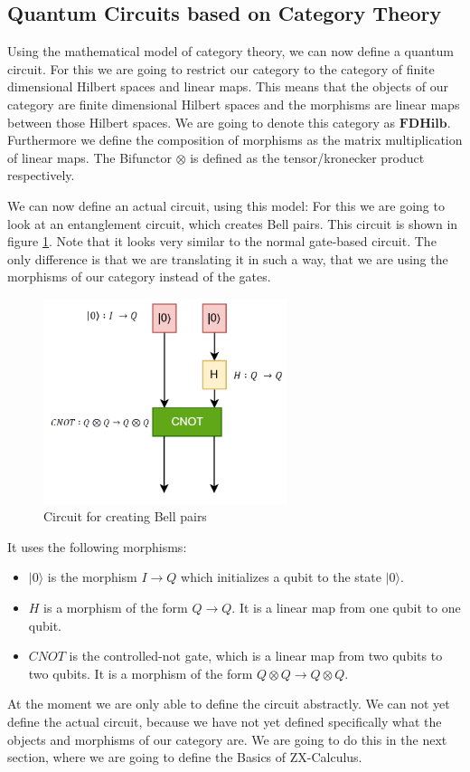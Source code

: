 \subsection{Quantum Circuits based on Category Theory}

Using the mathematical model of category theory, we can now define a quantum circuit. For this we are going to restrict our category to the category of finite dimensional Hilbert spaces and linear maps. This means that the objects of our category are finite dimensional Hilbert spaces and the morphisms are linear maps between those Hilbert spaces. We are going to denote this category as $\mathbf{FDHilb}$. Furthermore we define the composition of morphisms as the matrix multiplication of linear maps. The Bifunctor $\otimes$ is defined as the tensor/kronecker product respectively.

We can now define an actual circuit, using this model: For this we are going to look at an entanglement circuit, which creates Bell pairs. This circuit is shown in figure \ref{fig:bell_circuit}. Note that it looks very similar to the normal gate-based circuit. The only difference is that we are translating it in such a way, that we are using the morphisms of our category instead of the gates.

\begin{figure}
    \centering
    \includegraphics[height=6cm]{images/category-circuit.png}
    \caption{Circuit for creating Bell pairs}
    \label{fig:bell_circuit}
\end{figure}

It uses the following morphisms:

\begin{itemize}
    \item $|0\rangle$ is the morphism $I\rightarrow Q$ which initializes a qubit to the state $|0\rangle$.
    \item $H$ is a morphism of the form $Q\rightarrow Q$. It is a linear map from one qubit to one qubit.
    \item $CNOT$ is the controlled-not gate, which is a linear map from two qubits to two qubits. It is a morphism of the form $Q\otimes Q \rightarrow Q \otimes Q$.
\end{itemize}

At the moment we are only able to define the circuit abstractly. We can not yet define the actual circuit, because we have not yet defined specifically what the objects and morphisms of our category are. We are going to do this in the next section, where we are going to define the Basics of ZX-Calculus.